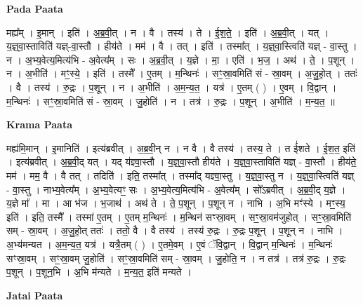 \documentclass[17pt]{extarticle}
\begin{document}
\textbf{Pada Paata} \newline

मह्य᳚म् । इ॒मान् । इति॑ । अ॒ब्र॒वी॒त् । न । वै । तस्य॑ । ते । ई॒श॒ते॒ । इति॑ । अ॒ब्र॒वी॒त् । यत् । य॒ज्ञ्॒वा॒स्ताविति॑ यज्ञ्-वा॒स्तौ । हीय॑ते । मम॑ । वै । तत् । इति॑ । तस्मा᳚त् । य॒ज्ञ्॒वा॒स्त्विति॑ यज्ञ् - वा॒स्तु । न । अ॒भ्य॒वेत्य॒मित्य॑भि - अ॒वेत्य᳚म् । सः । अ॒ब्र॒वी॒त् । य॒ज्ञे । मा॒ । एति॑ । भ॒ज॒ । अथ॑ । ते॒ । प॒शून् । न । अ॒भीति॑ । मꣳ॒॒स्ये॒ । इति॑ । तस्मै᳚ । ए॒तम् । म॒न्थिनः॑ । सꣳ॒॒स्रा॒वमिति॑ सं - स्रा॒वम् । अ॒जु॒हो॒त् । ततः॑ । वै । तस्य॑ । रु॒द्रः । प॒शून् । न । अ॒भीति॑ । अ॒म॒न्य॒त॒ । यत्र॑ । ए॒तम् ( ) । ए॒वम् । वि॒द्वान् । म॒न्थिनः॑ । सꣳ॒॒स्रा॒वमिति॑ सं - स्रा॒वम् । जु॒होति॑ । न । तत्र॑ । रु॒द्रः । प॒शून् । अ॒भीति॑ । म॒न्य॒त॒ ॥  \newline


\textbf{Krama Paata} \newline

मह्य॑मि॒मान् । इ॒मानिति॑ । इत्य॑ब्रवीत् । अ॒ब्र॒वी॒न् न । न वै । वै तस्य॑ । तस्य॒ ते । त ई॑शते । ई॒श॒त॒ इति॑ । इत्य॑ब्रवीत् । अ॒ब्र॒वी॒द् यत् । यद् य॑ज्ञ्वा॒स्तौ । य॒ज्ञ्॒वा॒स्तौ हीय॑ते । य॒ज्ञ्॒वा॒स्ताविति॑ यज्ञ् - वा॒स्तौ । हीय॑ते॒ मम॑ । मम॒ वै । वै तत् । तदिति॑ । इति॒ तस्मा᳚त् । तस्मा᳚द् यज्ञ्वा॒स्तु । य॒ज्ञ्॒वा॒स्तु न । य॒ज्ञ्॒वा॒स्त्विति॑ यज्ञ् - वा॒स्तु । नाभ्य॒वेत्य᳚म् । अ॒भ्य॒वेत्यꣳ॒॒ सः । अ॒भ्य॒वेत्य॒मित्य॑भि - अ॒वेत्य᳚म् । सो᳚ऽब्रवीत् । अ॒ब्र॒वी॒द् य॒ज्ञे । य॒ज्ञे मा᳚ । मा । आ भ॑ज । भ॒जाथ॑ । अथ॑ ते । ते॒ प॒शून् । प॒शून् न । नाभि । अ॒भि मꣳ॑स्ये । मꣳ॒॒स्य॒ इति॑ । इति॒ तस्मै᳚ । तस्मा॑ ए॒तम् । ए॒तम् म॒न्थिनः॑ । म॒न्थिन॑ सꣳस्रा॒वम् । सꣳ॒॒स्रा॒वम॑जुहोत् । सꣳ॒॒स्रा॒वमिति॑ सम् - स्रा॒वम् । अ॒जु॒हो॒त् ततः॑ । ततो॒ वै । वै तस्य॑ । तस्य॑ रु॒द्रः । रु॒द्रः प॒शून् । प॒शून् न । नाभि । अ॒भ्य॑मन्यत । अ॒म॒न्य॒त॒ यत्र॑ । यत्रै॒तम् ( ) । ए॒तमे॒वम् । ए॒वं ॅवि॒द्वान् । वि॒द्वान् म॒न्थिनः॑ । म॒न्थिनः॑ सꣳस्रा॒वम् । सꣳ॒॒स्रा॒वम् जु॒होति॑ । सꣳ॒॒स्रा॒वमिति॑ सम् - स्रा॒वम् । जु॒होति॒ न । न तत्र॑ । तत्र॑ रु॒द्रः । रु॒द्रः प॒शून् । प॒शून॒भि । अ॒भि म॑न्यते । म॒न्य॒त॒ इति॑ मन्यते । \newline

\textbf{Jatai Paata} \newline
\end{document}

